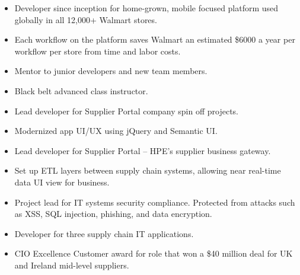 \documentclass[10pt,a4paper]{resume}
\begin{document}
\begin{itemize}
\item Developer since inception for home-grown, mobile focused platform used globally in all 12,000+ Walmart stores.
\item Each workflow on the platform saves Walmart an estimated \$6000 a year per workflow per store from time and labor costs.
\item Mentor to junior developers and new team members.
\end{itemize}

\divider

\begin{itemize}
\item Black belt advanced class instructor.
\end{itemize}

\divider

\begin{itemize}
\item Lead developer for Supplier Portal company spin off projects.
\item Modernized app UI/UX using jQuery and Semantic UI.
\end{itemize}

\divider

\begin{itemize}
\item Lead developer for Supplier Portal -- HPE's supplier business gateway.
\item Set up ETL layers between supply chain systems, allowing near real-time data UI view for business.
\item Project lead for IT systems security compliance. Protected from attacks such as XSS, SQL injection, phishing, and data encryption.
\end{itemize}

\divider

\begin{itemize}
\item Developer for three supply chain IT applications.
\item CIO Excellence Customer award for role that won a \$40 million deal for UK and Ireland mid-level suppliers.

\end{itemize}


\clearpage

\end{document}
